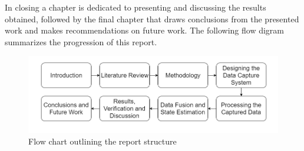 In closing a chapter is dedicated to presenting and discussing the results obtained, followed by the final chapter that draws conclusions from the presented work and makes recommendations on future work. The following flow digram summarizes the progression of this report.

\begin{figure}[!ht] 
\captionsetup{width=\linewidth, font=small}  
\includegraphics[width=\linewidth]{figures/introflow.png}
\caption{Flow chart outlining the report structure}
\label{fig:introflow}
\end{figure}